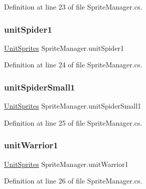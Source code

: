 Definition at line 23 of file Sprite\+Manager.\+cs.

\mbox{\label{class_sprite_manager_aabe45582c52f2f33409eddd3d74e95aa}} 
\subsubsection{\texorpdfstring{unitSpider1}{unitSpider1}}
{\footnotesize\ttfamily \mbox{\hyperlink{class_unit_sprites}{Unit\+Sprites}} Sprite\+Manager.\+unit\+Spider1}



Definition at line 24 of file Sprite\+Manager.\+cs.

\mbox{\label{class_sprite_manager_abcfa64673eda733ff5a0791fca6774ef}} 
\subsubsection{\texorpdfstring{unitSpiderSmall1}{unitSpiderSmall1}}
{\footnotesize\ttfamily \mbox{\hyperlink{class_unit_sprites}{Unit\+Sprites}} Sprite\+Manager.\+unit\+Spider\+Small1}



Definition at line 25 of file Sprite\+Manager.\+cs.

\mbox{\label{class_sprite_manager_a468d21273b76232a3c46e4806526191b}} 
\subsubsection{\texorpdfstring{unitWarrior1}{unitWarrior1}}
{\footnotesize\ttfamily \mbox{\hyperlink{class_unit_sprites}{Unit\+Sprites}} Sprite\+Manager.\+unit\+Warrior1}



Definition at line 26 of file Sprite\+Manager.\+cs.

\mbox{\label{class_sprite_manager_a2de0703584ff32d531f6abeddd2ab249}} 
